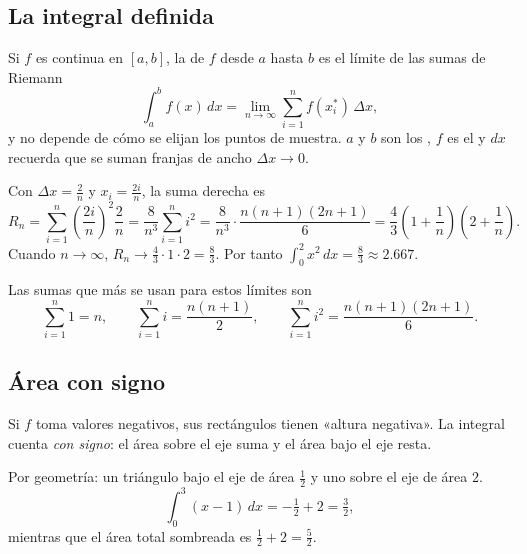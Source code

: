 \documentclass[11pt,a4paper]{article}
\newcommand{\dx}{\,dx}
\begin{document}
\subsection{La integral definida}
\begin{definicion}
Si $f$ es continua en $[a,b]$, la  de $f$ desde $a$ hasta $b$ es el límite de las sumas de Riemann
\[ \int_a^b f(x)\dx=\lim_{n\to\infty}\sum_{i=1}^{n}f(x_i^{*})\,\Delta x, \]
y no depende de cómo se elijan los puntos de muestra. $a$ y $b$ son los , $f$ es el
 y $dx$ recuerda que se suman franjas de ancho $\Delta x\to0$.
\end{definicion}
\begin{ejemplo}
Con $\Delta x=\frac2n$ y $x_i=\frac{2i}{n}$, la suma derecha es
\[ R_n=\sum_{i=1}^{n}\left(\frac{2i}{n}\right)^{2}\frac{2}{n}=\frac{8}{n^{3}}\sum_{i=1}^{n}i^{2}
      =\frac{8}{n^{3}}\cdot\frac{n(n+1)(2n+1)}{6}=\frac{4}{3}\left(1+\frac1n\right)\left(2+\frac1n\right). \]
Cuando $n\to\infty$, $R_n\to\frac43\cdot1\cdot2=\frac83$. Por tanto $\displaystyle\int_0^2x^{2}\dx=\frac83\approx2.667$.
\end{ejemplo}
Las sumas que más se usan para estos límites son
\[ \sum_{i=1}^{n}1=n,\qquad \sum_{i=1}^{n}i=\frac{n(n+1)}{2},\qquad \sum_{i=1}^{n}i^{2}=\frac{n(n+1)(2n+1)}{6}. \]

\subsection{Área con signo}
\begin{minipage}[c]{0.52\linewidth}
Si $f$ toma valores negativos, sus rectángulos tienen «altura negativa». La integral cuenta \emph{con signo}: el área
sobre el eje suma y el área bajo el eje resta.
\begin{ejemplo}[{$f(x)=x-1$ en $[0,3]$}]
Por geometría: un triángulo bajo el eje de área $\frac12$ y uno sobre el eje de área $2$.
\[ \int_0^3(x-1)\dx=-\tfrac12+2=\tfrac32, \]
mientras que el área total sombreada es $\tfrac12+2=\tfrac52$.
\end{ejemplo}
\end{minipage}\hfill
\begin{minipage}[c]{0.44\linewidth}\centering
{}
\end{minipage}
\end{document}
